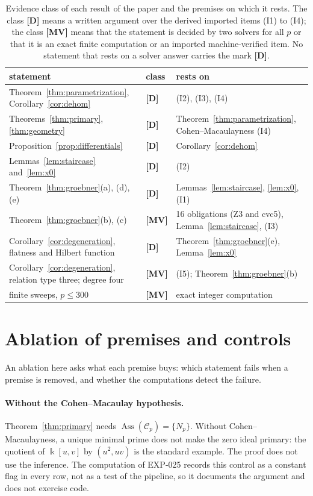 \documentclass[11pt]{article}
\theoremstyle{definition}
\theoremstyle{remark}
\newcommand{\kfield}{\Bbbk}
\newcommand{\Cfiber}{\mathcal{C}}
\newcommand{\mD}{\textbf{[D]}}
\newcommand{\mMV}{\textbf{[MV]}}
\begin{document}
\begin{table}[ht]
\centering
\small
\begin{tabular}{@{}lll@{}}
\toprule
statement & class & rests on\\
\midrule
Theorem~\ref{thm:parametrization}, Corollary~\ref{cor:dehom} & \mD & (I2), (I3), (I4)\\
Theorems~\ref{thm:primary}, \ref{thm:geometry} & \mD & Theorem~\ref{thm:parametrization}, Cohen--Macaulayness (I4)\\
Proposition~\ref{prop:differentials} & \mD & Corollary~\ref{cor:dehom}\\
Lemmas~\ref{lem:staircase} and~\ref{lem:x0} & \mD & (I2)\\
Theorem~\ref{thm:groebner}(a), (d), (e) & \mD & Lemmas~\ref{lem:staircase}, \ref{lem:x0}, (I1)\\
Theorem~\ref{thm:groebner}(b), (c) & \mMV & 16 obligations (Z3 and cvc5), Lemma~\ref{lem:staircase}, (I3)\\
Corollary~\ref{cor:degeneration}, flatness and Hilbert function & \mD & Theorem~\ref{thm:groebner}(e), Lemma~\ref{lem:x0}\\
Corollary~\ref{cor:degeneration}, relation type three; degree four & \mMV & (I5); Theorem~\ref{thm:groebner}(b)\\
finite sweeps, $p\leq300$ & \mMV & exact integer computation\\
\bottomrule
\end{tabular}
\caption{Evidence class of each result of the paper and the premises on which it rests. The class
\mD{} means a written argument over the derived imported items (I1) to (I4); the class \mMV{} means that the
statement is decided by two solvers for all $p$ or that it is an exact finite computation or an
imported machine-verified item. No statement that rests on a solver answer carries the mark \mD{}.}
\label{tab:marks}
\end{table}

\section{Ablation of premises and controls}\label{sec:ablation}

An ablation here asks what each premise buys: which statement fails when a premise is removed,
and whether the computations detect the failure.

\paragraph{Without the Cohen--Macaulay hypothesis.} Theorem~\ref{thm:primary} needs
$\operatorname{Ass}(\Cfiber_p)=\{N_p\}$. Without Cohen--Macaulayness, a unique minimal prime does not
make the zero ideal primary: the quotient of $\kfield[u,v]$ by $(u^2,uv)$ is the standard example. The proof does not use
the inference. The computation of EXP-025 records this control as a constant flag in every row, not as a
test of the pipeline, so it documents the argument and does not exercise code.
\end{document}
